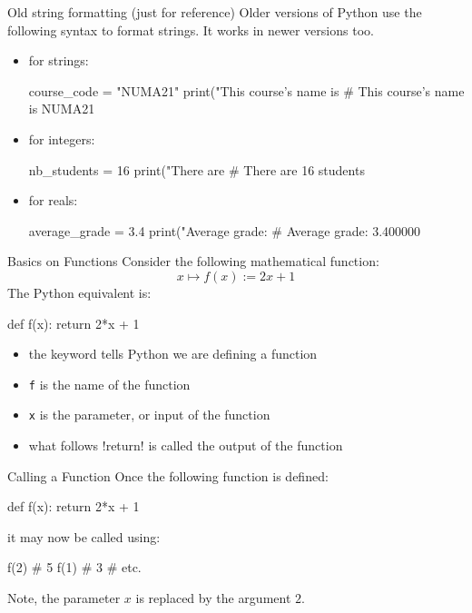\documentclass[hyperref={pdfpagelabels=false},table, handout]{beamer}
\begin{document}
\begin{frame}[fragile]{Old string formatting (just for reference)}
Older versions of Python use the following syntax to format strings. It works in newer versions too.
\begin{itemize}
\item for strings:
\begin{python}
course_code = "NUMA21"
print("This course's name is %
# This course's name is NUMA21
\end{python}
\item for integers:
\begin{python}
nb_students = 16
print("There are %
# There are 16 students
\end{python}
\item for reals:
\begin{python}
average_grade = 3.4
print("Average grade: %
# Average grade: 3.400000
\end{python}
\end{itemize}
\end{frame}



\begin{frame}[fragile]{Basics on Functions}
Consider the following mathematical \alert{function}:
\[x \mapsto f(x) := 2x + 1\]
The Python equivalent is:
\begin{python}
def f(x):
  return 2*x + 1
\end{python}
\begin{itemize}
\item the keyword  tells Python we are defining a function
\item \texttt{f} is the \alert{name} of the function
\item \texttt{x} is the \alert{parameter}, or \alert{input} of the function
\item what follows \pyth!return! is called the \alert{output} of the function
\end{itemize}
\end{frame}


\begin{frame}[fragile]{Calling a Function}
Once the following function is defined:
\begin{python}
def f(x):
  return 2*x + 1
\end{python}
it may now be called using:
\begin{python}
f(2) # 5
f(1) # 3
# etc.
\end{python}

Note, the \alert{parameter} $x$ is replaced by the \alert{argument} $2$.
\end{frame}
\end{document}
